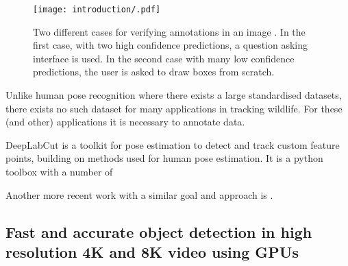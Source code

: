 \begin{figure}[ht]
  \centering
  \texttt{[image: introduction/.pdf]}
  \caption{Two different cases for verifying annotations in an image \cite{Konyushkova2017}. In the first case, with two high confidence predictions, a question asking interface is used. In the second case with many low confidence predictions, the user is asked to draw boxes from scratch. }
  \label{fig:intelligent_dialogs}
\end{figure}

Unlike human pose recognition where there exists a large standardised datasets, there exists no such dataset for many applications in tracking wildlife. For these (and other) applications it is necessary to annotate data.

DeepLabCut is a toolkit for pose estimation to detect and track custom feature points, building on methods used for human pose estimation. It is a python toolbox with a number of 



Another more recent work with a similar goal and approach is \cite{Graving2019}.



\subsection{Fast and accurate object detection in high resolution 4K and 8K video using GPUs \cite{Ruzicka2018}}
